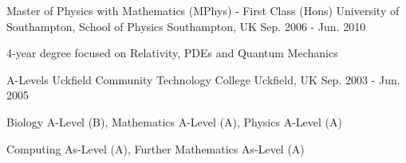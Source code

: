 \begin{cventries}
  \cventry
    {Master of Physics with Mathematics (MPhys) - First Class (Hons)} %
    {University of Southampton, School of Physics} %
    {Southampton, UK} %
    {Sep. 2006 - Jun. 2010} %
    {
      \begin{cvitems} %
	\item{4-year degree focused on Relativity, PDEs and Quantum Mechanics}
      \end{cvitems}
    }

  \cventry
    {A-Levels} %
    {Uckfield Community Technology College} %
    {Uckfield, UK} %
    {Sep. 2003 - Jun. 2005} %
    {
      \begin{cvitems} %
	\item{Biology A-Level (B), Mathematics A-Level (A), Physics A-Level (A)}
	\item{Computing As-Level (A), Further Mathematics As-Level (A)}
      \end{cvitems}
    }


\end{cventries}
